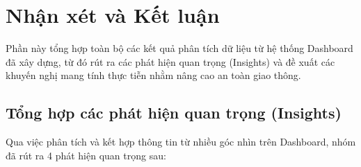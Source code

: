 \section{Nhận xét và Kết luận}
\label{sec:conclusion}

Phần này tổng hợp toàn bộ các kết quả phân tích dữ liệu từ hệ thống Dashboard đã xây dựng, từ đó rút ra các phát hiện quan trọng (Insights) và đề xuất các khuyến nghị mang tính thực tiễn nhằm nâng cao an toàn giao thông.

\subsection{Tổng hợp các phát hiện quan trọng (Insights)}

Qua việc phân tích và kết hợp thông tin từ nhiều góc nhìn trên Dashboard, nhóm đã rút ra 4 phát hiện quan trọng sau:

